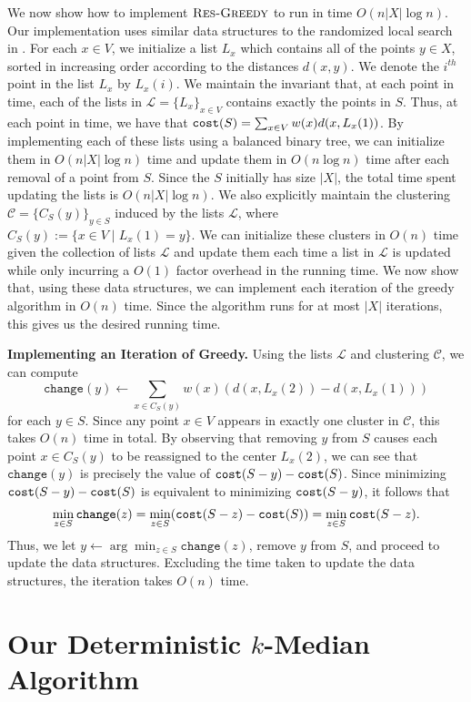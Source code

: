 \documentclass[11pt]{article}
\newcommand{\1}{\mathmybb{1}}
\newcommand{\cost}{\textnormal{\texttt{cost}}}
\newcommand{\Restr}{\textnormal{\textsc{Res-Greedy}}}
\begin{document}
We now show how to implement $\Restr$ to run in time $O(n |X| \log n)$. 
Our implementation uses similar data structures to the randomized local search in \cite{focs/BCLP24}. 
For each $x \in V$, we initialize a list $L_x$ which contains all of the points $y \in X$, sorted in increasing order according to the distances $d(x,y)$. We denote the $i^{th}$ point in the list $L_x$ by $L_x(i)$.
We maintain the invariant that, at each point in time, each of the lists in $\mathcal L = \{L_x\}_{x \in V}$ contains exactly the points in $S$.
Thus, at each point in time, we have that
$\cost(S) = \sum_{x \in V} w(x)d(x, L_x(1))$.
By implementing each of these lists using a balanced binary tree, we can initialize them in $O(n |X| \log n)$ time and update them in $O(n \log n)$ time after each removal of a point from $S$.
Since the $S$ initially has size $|X|$, the total time spent updating the lists is $O(n|X|\log n)$.
We also explicitly maintain the clustering $\mathcal C = \{C_S(y)\}_{y \in S}$ induced by the lists $\mathcal L$, where $C_S(y) := \{x \in V \mid L_x(1) = y\}$. We can initialize these clusters in $O(n)$ time given the collection of lists $\mathcal L$ and update them each time a list in $\mathcal L$ is updated while only incurring a $O(1)$ factor overhead in the running time. We now show that, using these data structures, we can implement each iteration of the greedy algorithm in $O(n)$ time. Since the algorithm runs for at most $|X|$ iterations, this gives us the desired running time.

\medskip
\noindent \textbf{Implementing an Iteration of Greedy.}
Using the lists $\mathcal L$ and clustering $\mathcal C$, we can compute
$$ \texttt{change}(y) \leftarrow \sum_{x \in C_S(y)} w(x)(d(x,L_x(2)) - d(x,L_x(1)) ) $$
for each $y \in S$.
Since any point $x \in V$ appears in exactly one cluster in $\mathcal C$, this takes $O(n)$ time in total.
By observing that removing $y$ from $S$ causes each point $x \in C_S(y)$ to be reassigned to the center $L_x(2)$,
we can see that $\texttt{change}(y)$ is precisely the value of $\cost(S - y) - \cost(S)$. Since minimizing $\cost(S - y) - \cost(S)$ is equivalent to minimizing $\cost(S - y)$, it follows that
$$ \min_{z \in S}\texttt{change}(z) = \min_{z \in S} (\cost(S - z) - \cost(S)) = \min_{z \in S} \cost(S - z). $$
Thus, we let $y \leftarrow \arg \min_{z \in S}\texttt{change}(z)$, remove $y$ from $S$, and proceed to update the data structures. Excluding the time taken to update the data structures, the iteration takes $O(n)$ time. 
\section{Our Deterministic $k$-Median Algorithm}\label{sec:our alg}
\end{document}
